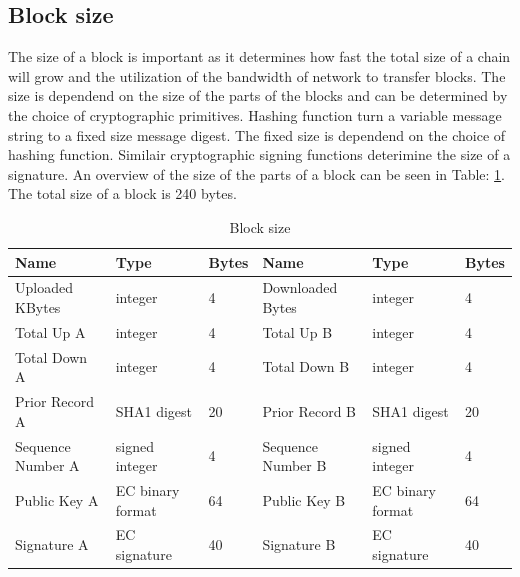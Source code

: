 \subsection{Block size}
The size of a block is important as it determines how fast the total size of a chain will grow
and the utilization of the bandwidth of network to transfer blocks.
The size is dependend on the size of the parts of the blocks
and can be determined by the choice of cryptographic primitives.
Hashing function turn a variable message string to a fixed size message digest\cite{VanderLubbe-crypto}.
The fixed size is dependend on the choice of hashing function.
Similair cryptographic signing functions deterimine the size of a signature.
An overview of the size of the parts of a block can be seen in Table: \ref{table:block_size}.
The total size of a block is 240 bytes.

\begin{table}[]
\begin{adjustwidth}{-.5in}{-.5in}
\begin{center}
\begin{tabular}{lll||lll}
Name              & Type             & Bytes                   & Name              & Type             & Bytes \\ \hline
Uploaded KBytes   & integer          & 4                       & Downloaded Bytes  & integer          & 4     \\
Total Up A        & integer          & 4                       & Total Up B        & integer          & 4     \\
Total Down A      & integer          & 4                       & Total Down B      & integer          & 4     \\
Prior Record A    & SHA1 digest      & 20                      & Prior Record B    & SHA1 digest      & 20    \\
Sequence Number A & signed integer   & 4                       & Sequence Number B & signed integer   & 4     \\
Public Key A      & EC binary format & 64                      & Public Key B      & EC binary format & 64    \\
Signature A       & EC signature     & 40                      & Signature B       & EC signature     & 40
\end{tabular}
\caption{Block size}
\label{table:block_size}
\end{center}
\end{adjustwidth}
\end{table}